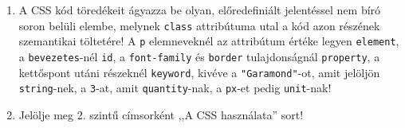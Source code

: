 \begin{frame}
\begin{columns}[c]
\begin{enumerate}
        \item A CSS kód töredékeit ágyazza be olyan, előredefiniált jelentéssel nem bíró soron belüli elembe, melynek \texttt{class} attribútuma utal a kód azon részének szemantikai töltetére! A \texttt{p} elemneveknél az attribútum értéke legyen \texttt{element}, a \texttt{bevezetes}-nél \texttt{id}, a \texttt{font-family} és \texttt{border} tulajdonságnál \texttt{property}, a kettőspont utáni részeknél \texttt{keyword}, kivéve a \texttt{"Garamond"}-ot, amit jelöljön \texttt{string}-nek, a \texttt{3}-at, amit \texttt{quantity}-nak, a \texttt{px}-et pedig \texttt{unit}-nak!
        \item Jelölje meg 2. szintű címsorként ,,A CSS használata'' sort!
        \setcounter{feladatSzamlalo}{\theenumi}
      \end{enumerate}
  \end{columns}
\end{frame}

